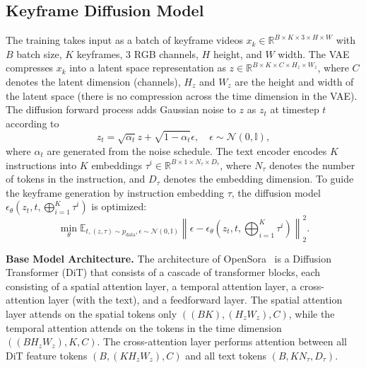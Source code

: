 \documentclass[letterpaper, 10 pt, conference]{ieeeconf}  %
\begin{document}
\subsection{Keyframe Diffusion Model} 
\label{sec:kd}

The training takes input as a batch of keyframe videos \( x_k \in \mathbb{R}^{B \times K \times 3 \times H \times W} \) with \( B \) batch size, \( K \) keyframes, \( 3 \) RGB channels, \( H \) height, and \( W \) width. The VAE compresses \( x_k \) into a latent space representation as \( z \in \mathbb{R}^{B \times K \times C \times H_z \times W_z} \), where \( C \) denotes the latent dimension (channels), \( H_z \) and \( W_z \) are the height and width of the latent space (there is no compression across the time dimension in the VAE). The diffusion forward process adds Gaussian noise to \(z\) as \(z_t\) at timestep $t$ according to 
\begin{equation}
    z_t = \sqrt{\alpha_t} z + \sqrt{1 - \alpha_t} \epsilon, \quad \epsilon \sim \mathcal{N}(0,  \mathbb{I}),
\end{equation}
where $\alpha_t$ are generated from the noise schedule. 
 The text encoder encodes \( K \) instructions into $K$ embeddings \( {\tau^i} \in \mathbb{R}^{B \times 1 \times N_{\tau} \times D_{\tau}} \), where \( N_{\tau} \) denotes the number of tokens in the instruction, and \( D_{\tau} \) denotes the embedding dimension. To guide the keyframe generation by instruction embedding \({\tau}\), the diffusion model \(\epsilon_\theta(z_t, t, \bigoplus_{i=1}^{K} \tau^i)
\) is optimized:
\begin{equation}
    \min_{\theta} \mathbb{E}_{t,(z, \tau) \sim p_{\text{data}}, \epsilon \sim \mathcal{N}(0, \mathbb{I})} \left\| \epsilon - \epsilon_\theta(z_t, t, \bigoplus_{i=1}^{K} \tau^i) \right\|_2^2.
\end{equation}

\noindent\textbf{Base Model Architecture.} The architecture of OpenSora~\cite{opensora} is a Diffusion Transformer (DiT) that consists of a cascade of transformer blocks, each consisting of a spatial attention layer, a temporal attention layer, a cross-attention layer (with the text), and a feedforward layer. The spatial attention layer attends on the spatial tokens only $((BK), (H_zW_z), C)$, while the temporal attention attends on the tokens in the time dimension $((BH_zW_z), K, C)$. The cross-attention layer performs attention between all DiT feature tokens $(B, (KH_zW_z), C)$ and all text tokens $(B, KN_{\tau}, D_{\tau})$.
\end{document}
